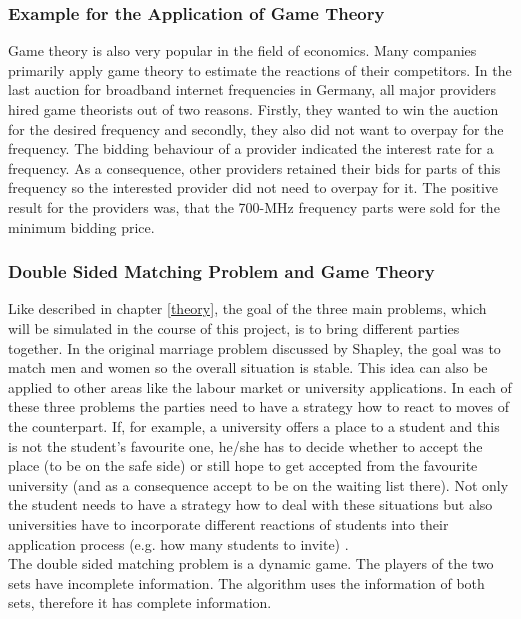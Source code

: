 \subsubsection{Example for the Application of Game Theory}
Game theory is also very popular in the field of economics.
Many companies primarily apply game theory to estimate the reactions of their competitors. 
In the last auction for broadband internet frequencies in Germany, all major providers hired game theorists out of two reasons. 
Firstly, they wanted to win the auction for the desired frequency and secondly, they also did not want to overpay for the frequency.
The bidding behaviour of a provider indicated the interest rate for a frequency. 
As a consequence, other providers retained their bids for parts of this frequency so the interested provider did not need to overpay for it. 
The positive result for the providers was, that the 700-MHz frequency parts were sold for the minimum bidding price. \cite{gametheoryWelt}

\subsubsection{Double Sided Matching Problem and Game Theory}

Like described in chapter \ref{theory}, the goal of the three main problems, which will be simulated in the course of this project, is to bring different parties together.
In the original marriage problem discussed by Shapley, the goal was to match men and women so the overall situation is stable.
This idea can also be applied to other areas like the labour market or university applications.
In each of these three problems the parties need to have a strategy how to react to moves of the counterpart.
If, for example, a university offers a place to a student and this is not the student's favourite one, he/she has to decide whether to accept the place (to be on the safe side) or still hope to get accepted from the favourite university (and as a consequence accept to be on the waiting list there).
Not only the student needs to have a strategy how to deal with these situations but also universities have to incorporate different reactions of students into their application process (e.g. how many students to invite) \cite{gale62a}. \\
The double sided matching problem is a dynamic game.
The players of the two sets have incomplete information.
The algorithm uses the information of both sets, therefore it has complete information.

